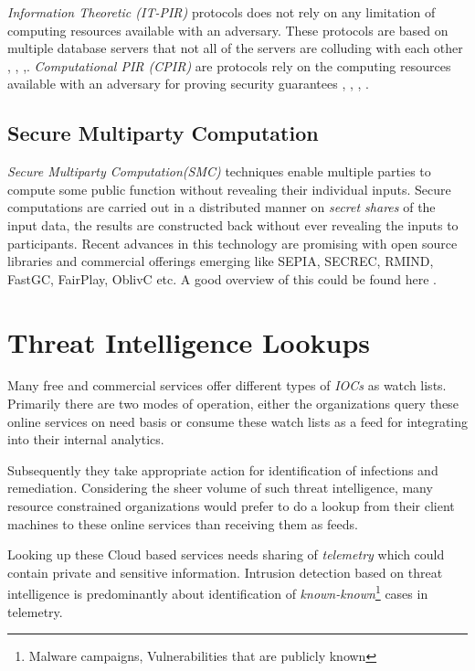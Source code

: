 \documentclass[runningheads,a4paper]{llncs}
\begin{document}
\emph{Information Theoretic (IT-PIR)} protocols does not rely on any limitation of computing resources available with an adversary.  These protocols are based on multiple database servers that not all of the servers are colluding with each other \cite{beimel2000reducing}, \cite{goldberg2007improving}, \cite{henry2011practical},\cite{olumofin2012revisiting}. \emph{Computational PIR (CPIR)} are protocols rely on the computing resources available with an adversary for proving security guarantees \cite{chor1997computationally}, \cite{kushilevitz1997replication}, \cite{chang2004single}, \cite{aguilar2014xpire}. 

\subsection{Secure Multiparty Computation}
\emph{Secure Multiparty Computation(SMC)} techniques enable multiple parties to compute some public function without revealing their individual inputs. Secure computations are carried out in a distributed manner on \emph{secret shares} of the input data, the results are constructed back without ever revealing the inputs to participants. Recent advances in this technology are promising with open source libraries and commercial offerings emerging like SEPIA, SECREC, RMIND, FastGC, FairPlay, OblivC etc. A good overview of this could be found here \cite{coed}.

\section{Threat Intelligence Lookups}
Many free and commercial services offer different types of \emph{IOCs} as watch lists. Primarily there are two modes of operation, either the organizations query these online services on need basis or consume these watch lists as a feed for integrating into their internal analytics.
 
Subsequently they take appropriate action for identification of infections and remediation. Considering the sheer volume of such threat intelligence, many resource constrained organizations would prefer to do a lookup from their client machines to these online services than receiving them as feeds. 

Looking up these Cloud based services needs sharing of \emph{telemetry} which could contain private and sensitive information. Intrusion detection based on threat intelligence is predominantly about identification of \emph{known-known}\footnote{Malware campaigns, Vulnerabilities that are publicly known}  cases in telemetry.
 
\end{document}
